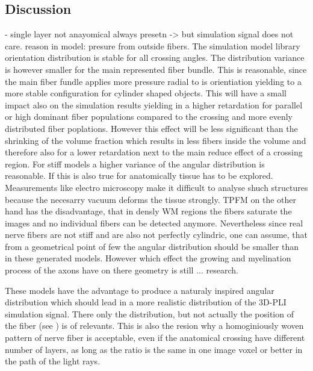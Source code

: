 \subsection{Discussion}
%
% 
- single layer not anayomical always presetn -> but simulation signal does not care. reason in model: presure from outside fibers.
% 
The simulation model library orientation distribution is stable for all crossing angles.
The distribution variance is however smaller for the main represented fiber bundle.
This is reasonable, since the main fiber fundle applies more pressure radial to is orientiation yielding to a more stable configuration for cylinder shaped objects.
This will have a small impact also on the simulation results yielding in a higher retardation for parallel or high dominant fiber populations compared to the crossing and more evenly distributed fiber poplations.
However this effect will be less significant than the shrinking of the volume fraction which results in less fibers inside the volume and therefore also for a lower retardation next to the main reduce effect of a crossing region.
For stiff models a higher variance of the angular distribution is reasonable. 
If this is also true for anatomically tissue has to be explored.
Measurements like electro microscopy make it difficult to analyse shuch structures because the necesarry vacuum deforms the tissue strongly.
TPFM on the other hand has the disadvantage, that in densly \ac{WM} regions the fibers saturate the images and no individual fibers can be detected anymore.
Nevertheless since real nerve fibers are not stiff and are also not perfectly cylindric, one can assume, that from a geometrical point of few the angular distribution should be smaller than in these generated models.
However which effect the growing and myelination process of the axons have on there geometry is still ... research.

These models have the advantage to produce a naturaly inspired angular distribution which should lead in a more realistic distribution of the \ac{3D-PLI} simulation signal.
There only the distribution, but not actually the position of the fiber (see \dummy{}) is of relevants.
This is also the resion why a homoginiously woven pattern of nerve fiber is acceptable, even if the anatomical crossing have different number of layers, as long as the ratio is the same in one image voxel or better in the path of the light rays.